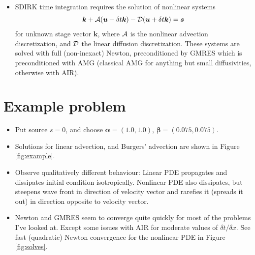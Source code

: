 \documentclass[review]{siamart}
\begin{document}
\begin{itemize}
\item SDIRK time integration requires the solution of nonlinear systems \[\bm{k} + {\cal A}(\bm{u} + \delta t \bm{k}) - {\cal D}(\bm{u} + \delta t \bm{k}) = \bm{s}\] for unknown stage vector $\bm{k}$, where ${\cal A}$ is the nonlinear advection discretization, and ${\cal D}$ the linear diffusion discretization. These systems are solved with full (non-inexact) Newton, preconditioned by GMRES which is preconditioned with AMG (classical AMG for anything but small diffusivities, otherwise with AIR).
\end{itemize}





\section{Example problem}

\begin{itemize}
\setlength\itemsep{0.5em}
\item Put source $s = 0$, and choose $\bm{\alpha}=(1.0,1.0)$, $\bm{\beta}=(0.075,0.075)$. 

\item Solutions for linear advection, and Burgers' advection are shown in Figure \ref{fig:example}.

\item Observe qualitatively different behaviour: Linear PDE propagates and dissipates initial condition isotropically. Nonlinear PDE also dissipates, but steepens wave front in direction of velocity vector and rarefies it (spreads it out) in direction opposite to velocity vector.

\item Newton and GMRES seem to converge quite quickly for most of the problems I've looked at. Except some issues with AIR for moderate values of $\delta t/ \delta x$. See fast (quadratic) Newton convergence for the nonlinear PDE in Figure \ref{fig:solves}.
\end{itemize}
\end{document}
